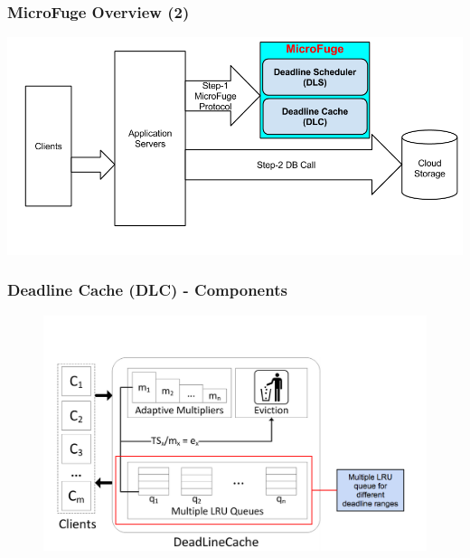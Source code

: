 \documentclass{beamer}
\begin{document}
\begin{frame}
  \frametitle{MicroFuge Overview (2)}
  \begin{center}
  \includegraphics[scale=0.33]{img/MF_FULL_NEW_2.png}
  \end{center}
\end{frame}

\begin{frame}
  \frametitle{Deadline Cache (DLC) - Components}
  \begin{figure}
    \begin{center}
      \centerline{\includegraphics[scale=0.33]{img/DLC_ARC_1.png}}
    \end{center}
  \end{figure}
\end{frame}
\end{document}
